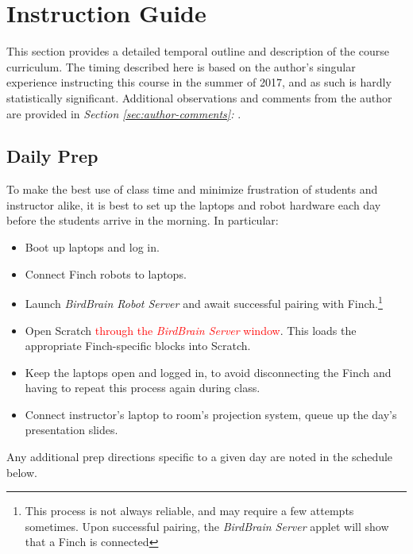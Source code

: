 \documentclass[a4paper]{article}
\begin{document}
	\newpage
	
	\section{Instruction Guide}
	
	This section provides a detailed temporal outline and description of the course curriculum. The timing described here is based on the author's singular experience instructing this course in the summer of 2017, and as such is hardly statistically significant. Additional observations and comments from the author are provided in \emph{Section \ref{sec:author-comments}: }. 
	
	\subsection{Daily Prep}
	
		To make the best use of class time and minimize frustration of students and instructor alike, it is best to set up the laptops and robot hardware each day before the students arrive in the morning. In particular:
		
		\begin{itemize}
			\item Boot up laptops and log in.
			
			\item Connect Finch robots to laptops.
			
			\item Launch \emph{BirdBrain Robot Server} and await successful pairing with Finch.\footnote[1]{This process is not always reliable, and may require a few attempts sometimes. Upon successful pairing, the \emph{BirdBrain Server} applet will show that a Finch is connected}
			
			\item Open Scratch \textcolor{red}{through the \emph{BirdBrain Server} window}. This loads the appropriate Finch-specific blocks into Scratch.
			
			\item Keep the laptops open and logged in, to avoid disconnecting the Finch and having to repeat this process again during class.
			
			\item Connect instructor's laptop to room's projection system, queue up the day's presentation slides.
		\end{itemize}
	
		Any additional prep directions specific to a given day are noted in the schedule below.
	
\end{document}
